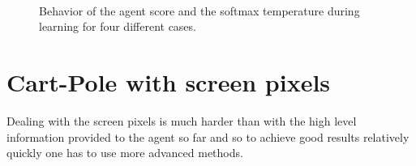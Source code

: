 \documentclass[a4paper, 11pt]{article}
\begin{document}
  \begin{figure}
    \centering
     \quad
     \\
     \quad
    \caption{Behavior of the agent score and the softmax temperature during learning for four different cases.}
    \label{fig:scores}
  \end{figure}


\section{Cart-Pole with screen pixels}
  Dealing with the screen pixels is much harder than with the high level information provided to the agent so far and so to achieve good results relatively quickly one has to use more advanced methods.
\end{document}
